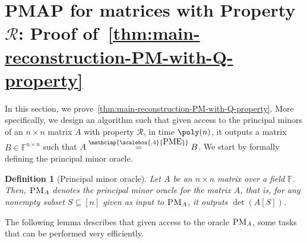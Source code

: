 \documentclass[11pt,letterpaper]{article}
\newcommand{\F}{\mathbb{F}}
\newtheorem{definition}{Definition}[section]
\newcommand{\PME}{\stackrel{\mathclap{\scalebox{.4}{\mbox{PME}}}}{=}}
\newcommand{\prop}{\mathcal{R}}
\newcommand{\PMoracle}[1]{\textsc{PM}_{#1}}
\newcommand{\submatrixfamily}[1]{\mathcal{F}_{#1}}
\begin{document}
{{{%





\section{PMAP for matrices with Property $\prop$: Proof of~\cref{thm:main-reconstruction-PM-with-Q-property}} \label{sec: PMAP for matrices with prop R}

In this section, we prove~\cref{thm:main-reconstruction-PM-with-Q-property}. More specifically, we design an algorithm such that given access to the principal minors of an $n\times n$ matrix $A$ with property $\prop$, in time $\poly(n)$, it outputs a matrix $B\in\F^{n\times n}$ such that $A\PME B$. We start by formally defining the principal minor oracle. 

\begin{definition}[Principal minor oracle]
\label{def:prinicpal-minor-oracle}
Let $A$ be an $n\times n$ matrix over a field $\F$. Then, $\PMoracle{A}$ denotes the principal minor oracle for the matrix $A$, that is, for any nonempty subset $S\subseteq [n]$ given as input to $\PMoracle{A}$, it outputs $\det(A[S])$.
\end{definition}
The following lemma describes that given access to the oracle $\PMoracle{A}$, some tasks that can be performed very efficiently.


}}}
\end{document}
